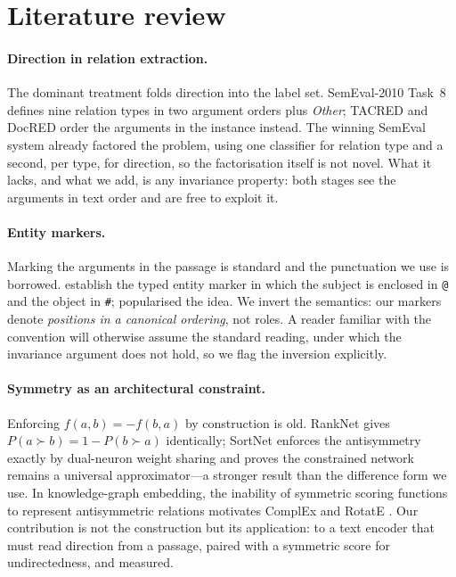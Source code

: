 \documentclass[11pt]{article}
\begin{document}
\section{Literature review}
\label{sec:related}

\paragraph{Direction in relation extraction.}
The dominant treatment folds direction into the label set. SemEval-2010 Task~8
\citep{hendrickx2010semeval} defines nine relation types in two argument orders plus
\emph{Other}; TACRED \citep{zhang2017position} and DocRED \citep{yao2019docred} order the
arguments in the instance instead. The winning SemEval system \citep{rink2010utd} already
factored the problem, using one classifier for relation type and a second, per type, for
direction, so the factorisation itself is not novel. What it lacks, and what we add, is any
invariance property: both stages see the arguments in text order and are free to exploit it.

\paragraph{Entity markers.}
Marking the arguments in the passage is standard and the punctuation we use is borrowed.
\citet{zhou2021improved} establish the typed entity marker in which the subject is enclosed in
\texttt{@} and the object in \texttt{\#}; \citet{soares2019matching} popularised the idea. We
invert the semantics: our markers denote \emph{positions in a canonical ordering}, not roles.
A reader familiar with the convention will otherwise assume the standard reading, under which
the invariance argument does not hold, so we flag the inversion explicitly.

\paragraph{Symmetry as an architectural constraint.}
Enforcing $f(a,b) = -f(b,a)$ by construction is old. RankNet \citep{burges2005ranknet} gives
$P(a \succ b) = 1 - P(b \succ a)$ identically; SortNet \citep{rigutini2011sortnet} enforces the
antisymmetry exactly by dual-neuron weight sharing and proves the constrained network remains a
universal approximator---a stronger result than the difference form we use. In knowledge-graph
embedding, the inability of symmetric scoring functions to represent antisymmetric relations
motivates ComplEx \citep{trouillon2016complex} and RotatE \citep{sun2019rotate}. Our
contribution is not the construction but its application: to a text encoder that must read
direction from a passage, paired with a symmetric score for undirectedness, and measured.
\end{document}
